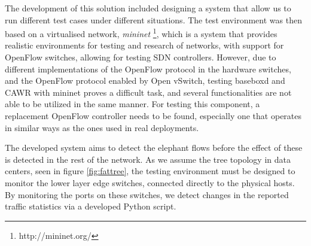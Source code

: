 \par The development of this solution included designing a system that allow us to run different test cases under different situations. The test environment was then based on a virtualised network, \textit{mininet} 
\footnote{http://mininet.org/}, which is a system that provides realistic environments for testing and research of networks, with support for OpenFlow switches, allowing for testing SDN controllers. However, due to different 
implementations of the OpenFlow protocol in the hardware switches, and the OpenFlow protocol enabled by Open vSwitch, testing baseboxd and CAWR with mininet proves a difficult task, and several functionalities are not able to be 
utilized in the same manner. For testing this component, a replacement OpenFlow controller needs to be found, especially one that operates in similar ways as the ones used in real deployments. 

\par The developed system aims to detect the elephant flows before the effect of these is detected in the rest of the network. As we assume the tree topology in data centers, seen in figure \ref{fig:fattree}, the testing environment
must be designed to monitor the lower layer edge switches, connected directly to the physical hosts. By monitoring the ports on these switches, we detect changes in the reported traffic statistics via a developed Python script.
